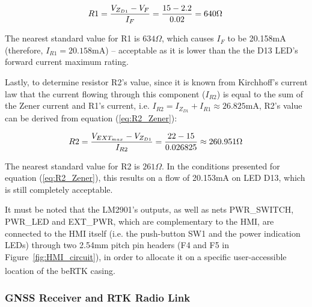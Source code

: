 \begin{equation}\label{eq:R1_Zener}
	R1=\frac{V_{Z_{D1}} - V_F}{I_F}=\frac{15 - 2.2}{0.02}=640\Omega \,\medskip
\end{equation}

The nearest standard value for R1 is $634 \Omega$, which causes $I_F$ to be 20.158mA (therefore, $I_{R1}=20.158$mA) -- acceptable as it is lower than the the D13 LED's forward current maximum rating.

Lastly, to determine resistor R2's value, since it is known from Kirchhoff's current law that the current flowing through this component ($I_{R2}$) is equal to the sum of the Zener current and R1's current, i.e. $I_{R2}=I_{Z_{D1}}+I_{R1} \approx 26.825$mA, R2's value can be derived from equation (\ref{eq:R2_Zener}):

\begin{equation}\label{eq:R2_Zener}
	R2 = \frac{V_{EXT_{max}} - V_{Z_{D1}}}{I_{R2}} = \frac{22 - 15}{0.026825} \approx 260.951 \Omega \,\medskip
\end{equation}

The nearest standard value for R2 is $261 \Omega$. In the conditions presented for equation (\ref{eq:R2_Zener}), this results on a flow of 20.153mA on LED D13, which is still completely acceptable.

It must be noted that the LM2901's outputs, as well as nets PWR\_SWITCH, PWR\_LED and EXT\_PWR, which are complementary to the HMI, are connected to the HMI itself (i.e. the push-button SW1 and the power indication LEDs) through two 2.54mm pitch pin headers (F4 and F5 in Figure~\ref{fig:HMI_circuit}), in order to allocate it on a specific user-accessible location of the beRTK\textsuperscript{\textregistered} casing.






\subsubsection{GNSS Receiver and RTK Radio Link}\label{sec:3232_ZEDF9P}


